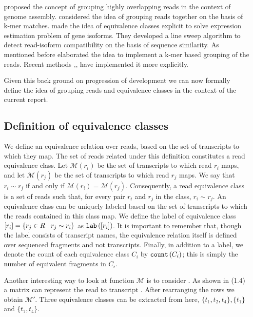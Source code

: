 \citet{pop2004} proposed the concept of grouping highly overlapping reads in the context of genome assembly. \citet{Salmela2011} considered the idea of grouping reads together on the basis of k-mer matches. \citet{isoem} made the idea of equivalence classes explicit to solve expression estimation problem of gene isoforms. They developed a line sweep algorithm to detect read-isoform compatibility on the basis of sequence similarity. As mentioned before \citep{sailfish} elaborated the idea to implement a k-mer based grouping of the reads. Recent methods \citep{kallisto},\citep{salmon},\citep{rapmap} have implemented it more explicitly. 

Given this back ground on progression of development we can now formally define the idea of grouping reads and equivalence classes in the context of the current report.  

\subsection{Definition of equivalence classes}
\label{subsec:gen_equiv_classes}
We define an equivalence relation over reads, based on the set of transcripts to which they map.  The set of reads related under this definition constitutes a read equivalence class. Let $\mathcal{M}\left(r_i\right)$ be the set of transcripts to which read $r_i$ maps, and let $\mathcal{M}\left(r_j\right)$ be the set of transcripts to which read $r_j$ maps.  We say that $r_i \sim r_j$ if and only if $\mathcal{M}\left(r_i\right) = \mathcal{M}\left(r_j\right)$. Consequently, a read equivalence class is a set of reads such that, for every pair $r_i$ and $r_j$ in the class, $r_i \sim r_j$. An equivalence class can be uniquely labeled based on the set of transcripts to which the reads contained in this class map.  We define the label of equivalence class $\left[r_i\right] = \{ r_j \in R \mid r_j \sim r_i\}$ as $\text{\texttt{lab}}\left(\left[r_i\right]\right)$.  It is important to remember that, though the label consists of transcript names, the equivalence relation itself is defined over sequenced fragments and not transcripts. Finally, in addition to a label, we denote the count of each equivalence class $C_i$ by $\text{\texttt{count}}\left(C_i\right)$; this is simply the number of equivalent fragments in $C_i$.


Another interesting way to look at function $\mathcal{M}$ is to consider . As shown in (1.4) a  matrix can represent the read to transcript . After rearranging the rows we obtain $\mathcal{M'}$. Three equivalence classes can be extracted from here, $\{t_1,t_2,t_4\}, \{t_1\}$ and $\{t_1,t_4\}$. 


